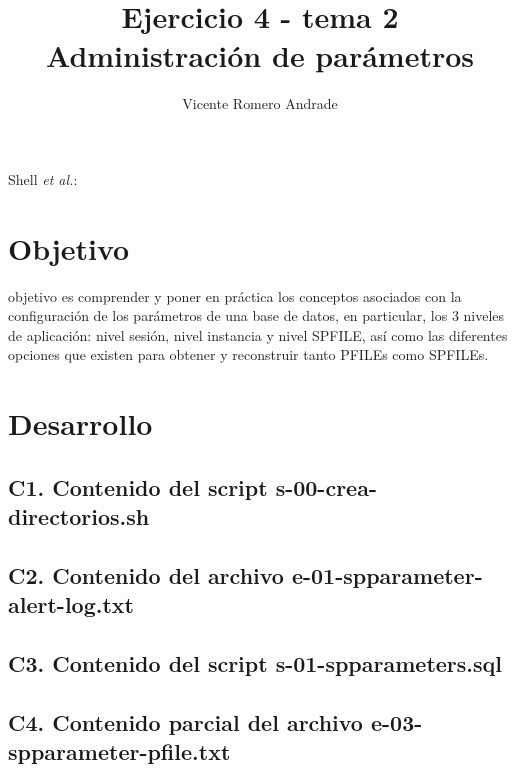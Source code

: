\documentclass[journal]{IEEEtran}
\begin{document}
\title{Ejercicio 4 - tema 2 \\ Administración de parámetros}
%
\author{Vicente Romero Andrade}

%
{Shell \MakeLowercase{\textit{et al.}}: }

\maketitle


\IEEEpeerreviewmaketitle

\section{Objetivo}

 objetivo es comprender y poner en práctica los conceptos asociados con la configuración de los 
parámetros de una base de datos, en particular, los 3 niveles de aplicación: nivel sesión, nivel instancia y nivel SPFILE, 
así como las diferentes opciones que existen para obtener y reconstruir tanto PFILEs como SPFILEs.


\section{Desarrollo}
\subsection{C1. Contenido del script s-00-crea-directorios.sh}

\subsection{C2. Contenido del archivo e-01-spparameter-alert-log.txt}

\subsection{C3. Contenido del script s-01-spparameters.sql}
\UseRawInputEncoding

\subsection{C4. Contenido parcial del archivo e-03-spparameter-pfile.txt}

\end{document}
